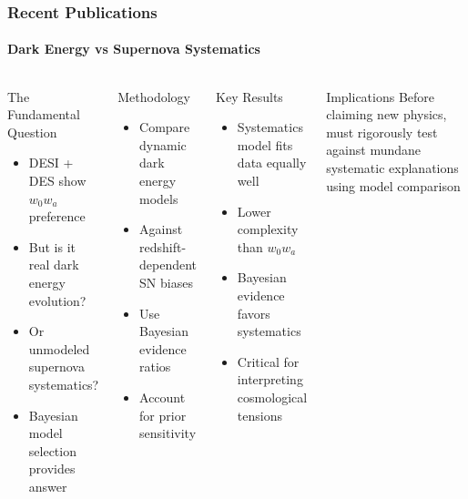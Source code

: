 \documentclass[aspectratio=169]{beamer}
\begin{document}
\begin{frame}
    \frametitle{Recent Publications}
    \framesubtitle{Dark Energy vs Supernova Systematics }
    \begin{columns}
        \begin{block}{The Fundamental Question}
            \begin{itemize}
                \item DESI + DES show $w_0w_a$ preference
                \item But is it real dark energy evolution?
                \item Or unmodeled supernova systematics?
                \item Bayesian model selection provides answer
            \end{itemize}
        \end{block}
        \begin{block}{Methodology}
            \begin{itemize}
                \item Compare dynamic dark energy models
                \item Against redshift-dependent SN biases
                \item Use Bayesian evidence ratios
                \item Account for prior sensitivity
            \end{itemize}
        \end{block}
        \begin{block}{Key Results}
            \begin{itemize}
                \item Systematics model fits data equally well
                \item Lower complexity than $w_0w_a$
                \item Bayesian evidence favors systematics
                \item Critical for interpreting cosmological tensions
            \end{itemize}
        \end{block}
        \begin{block}{Implications}
            Before claiming new physics, must rigorously test against mundane systematic explanations using model comparison
        \end{block}
    \end{columns}
\end{frame}
\end{document}
